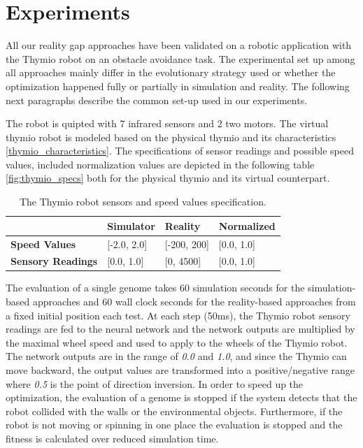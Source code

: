 \chapter{Experiments}

All our reality gap approaches have been validated on a robotic application with the Thymio robot on an obstacle avoidance task. The experimental set up among all approaches mainly differ in the evolutionary strategy used or whether the optimization happened fully or partially in simulation and reality. The following next paragraphs describe the common set-up used in our experiments.

The robot is quipted with 7 infrared sensors and 2 two motors. The virtual thymio robot is modeled based on the physical thymio and its characteristics \ref{thymio_characteristics}. The specifications of sensor readings and possible speed values, included normalization values are depicted in the following table \ref{fig:thymio_specs} both for the physical thymio and its virtual counterpart.

\begin{table}[H]
\begin{tabular}{llll}
\centering
\hline
\textbf{}                            & \textbf{Simulator}    & \textbf{Reality}  & \textbf{Normalized}  \\ \hline
\textbf{Speed Values}                & {[}-2.0, 2.0{]}       & {[}-200, 200{]}      & {[}0.0, 1.0{]} \\
\textbf{Sensory Readings}            & {[}0.0, 1.0{]}        & {[}0, 4500{]}        & {[}0.0, 1.0{]} \\
\end{tabular}
\caption{The Thymio robot sensors and speed values specification.}
\label{tab:thymio_specs}
\end{table}

The evaluation of a single genome takes 60 simulation seconds for the simulation-based approaches and 60 wall clock seconds for the reality-based approaches from a fixed initial position each test. At each step (50ms), the Thymio robot sensory readings are fed to the neural network and the network outputs are multiplied by the maximal wheel speed and used to apply to the wheels of the Thymio robot. The network outputs are in the range of \emph{0.0} and \emph{1.0}, and since the Thymio can move backward, the output values are transformed into a positive/negative range where \emph{0.5} is the point of direction inversion. In order to speed up the optimization, the evaluation of a genome is stopped if the system detects that the robot collided with the walls or the environmental objects. Furthermore, if the robot is not moving or spinning in one place the evaluation is stopped and the fitness is calculated over reduced simulation time.

